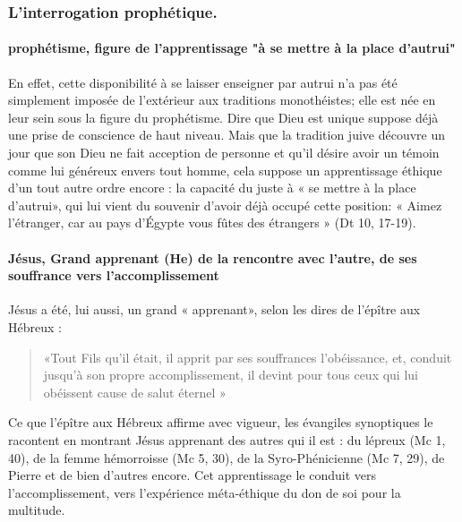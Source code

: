 \subsubsection{L'interrogation prophétique.}

\paragraph{prophétisme, figure de l'apprentissage "à se mettre à la place d'autrui"} 
En effet, cette disponibilité à se laisser enseigner par autrui n'a pas été simplement imposée de l'extérieur aux traditions monothéistes; elle est née en leur sein sous la figure du prophétisme. Dire que Dieu est unique suppose déjà une prise de conscience de haut niveau. Mais que la tradition juive découvre un jour que son Dieu ne fait acception de personne et qu'il désire avoir un témoin comme lui généreux envers tout homme, cela suppose un apprentissage éthique d'un tout autre ordre encore : la capacité du juste à « se mettre à la place d'autrui», qui lui vient du souvenir d'avoir déjà occupé cette position: « Aimez l'étranger, car au pays d'Égypte vous fûtes des étrangers » (Dt 10, 17-19).
\paragraph{Jésus, Grand apprenant (He) de la rencontre avec l'autre, de ses souffrance vers l'accomplissement}
Jésus a été, lui aussi, un grand « apprenant», selon les dires de l'épître aux Hébreux : \begin{Ecriture}[He 5, 8]
\begin{quote}
       «Tout Fils qu'il était, il apprit par ses souffrances l'obéissance, et, conduit jusqu'à son propre accomplissement, il devint pour tous ceux qui lui obéissent cause de salut éternel » 
\end{quote}
 
\end{Ecriture} 
Ce que l'épître aux Hébreux affirme avec vigueur, les évangiles synoptiques le racontent en montrant Jésus apprenant des autres qui il est : du lépreux (Mc 1, 40), de la femme hémorroisse (Mc 5, 30), de la Syro-Phénicienne (Mc 7, 29), de Pierre et de bien d'autres encore.
Cet apprentissage le conduit vers l'accomplissement, vers l'expérience méta-éthique du don de soi pour la multitude.

